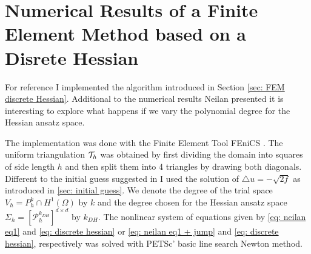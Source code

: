 \section{Numerical Results of a Finite Element Method based on a Disrete Hessian}

For reference I implemented the algorithm introduced in Section \ref{sec: FEM discrete Hessian}.
Additional to the numerical results Neilan presented it is interesting to explore what happens if we vary the polynomial degree for the Hessian ansatz space. 

The implementation was done with the Finite Element Tool FEniCS \cite{FEniCS}. The uniform triangulation $\mathcal{T}_h$ was obtained by first dividing the domain into squares of side length $h$ and then split them into 4 triangles by drawing both diagonals. \\
Different to the initial guess suggested in \cite{Neilan2014} I used the solution of $\triangle u = -\sqrt{2f}$ as introduced in \ref{sec: initial guess}. 
We denote the degree of the trial space $V_h=P_h^k \cap H^1(\Omega)$ by $k$ and the degree chosen for the Hessian ansatz space $\Sigma_h = [\mathcal{P}_h^{k_{DH}}]^{d \times d}$ by $k_{DH}$. The nonlinear system of equations given by \eqref{eq: neilan eq1} and \eqref{eq: discrete hessian} or \eqref{eq: neilan eq1 + jump} and \eqref{eq: discrete hessian}, respectively was solved with PETSc' basic line search Newton method. 

